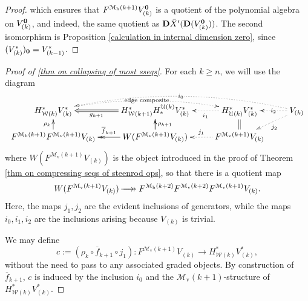 \documentclass[11pt]{amsart} \renewcommand{\baselinestretch}{1.4}
\theoremstyle{plain}
\theoremstyle{definition}
\renewcommand{\to}{\longrightarrow}
\newcommand{\calU}{\mathcal{U}}
\newcommand{\calw}{\mathcal{W}}
\newcommand{\calMv}{\mathcal{M}\dver}
\newcommand{\calMh}{\mathcal{M}\dhor}
\newcommand{\epi}{{\,\makebox[0cm][l]{\ensuremath\to}\to{}}}
\newcommand{\UEAX}{\bar{X}'}%
\newcommand{\dver}{_\mathrm{v}}
\newcommand{\dhor}{_\mathrm{h}}
\newcommand{\dual}{\mathbf{D}}
\begin{document}
\begin{Calculations of HWn for n nonzero}
\begin{proof}
which ensures that $F^{\calMh(k+1)}V_{(k)}^{\textbf{\textup{0}}}$ is a quotient of the polynomial algebra on $V_{(k)}^{\textbf{\textup{0}}}$, and indeed, the same quotient as $\dual\UEAX(\dual(V_{(k)}^{\textbf{\textup{0}}}))$. The second isomorphism is Proposition \ref{calculation in internal dimension zero}, since $(V^*_{(k)})_{\textbf{\textup{0}}}=V^*_{(k-1)}$.
\end{proof}
\begin{proof}[Proof of \ref{thm on collapsing of most sseqs}]
For each $k\geq n$, we will use the diagram
\[\xymatrix@R=4mm{
H^*_{\calw(k)}V^*_{(k)}\ar@{..>}@/^1.22em/[rr]|-{\textup{\,edge composite\,}}
&H^*_{\calw(k+1)}H_*^{\calU(k)}V^*_{(k)}\ar@{=>}[l]^-{g_{k+1}}%
&H^*_{\calU(k)}V^*_{(k)}\ar@{..>}[l]^-{i_1}
&V_{(k)}\ar@{..>}[l]|-{\,i_2\,}\ar@{..>}[ld]^-{j_2}\ar@{..>}@/_1.72em/[lll]|-{\,i_0\,}
\\
F^{\calMh(k+1)}F^{\calMv(k+1)}V_{(k)}\ar[u]^-{\rho_k}
&W(F^{\calMv(k+1)}V_{(k)})\ar[u]\ar@{->>}[l]_-{\overline{f}_{k+1}}\ar[u]_-{\rho_{k+1}}
&F^{\calMv(k+1)}V_{(k)}\ar@{..>}[l]_-{j_1}\ar@{=}[u]%
}\]
where $W(F^{\calMv(k+1)}V_{(k)})$ is the object introduced in the proof of Theorem \ref{thm on compressing seqs of steenrod ops}, so that there is a quotient map
\[W(F^{\calMv(k+1)}V_{(k)})\epi F^{\calMh(k+2)}F^{\calMv(k+2)}F^{\calMv(k+1)}V_{(k)}.\]
Here, the maps $j_1,j_2$ are the evident inclusions of generators, while the maps $i_0,i_1,i_2$ are the inclusions arising because $V_{(k)}$ is trivial.

 We may define 
\[c:=(\rho_k\circ \overline{f}_{k+1}\circ j_1):F^{\calMv(k+1)}V_{(k)}\to H^*_{\calw(k)}V^*_{(k)},\]
without the need to pass to any associated graded objects. By construction of $\overline{f}_{k+1}$,  $c$ is induced by the inclusion $i_0$ and the $\calMv(k+1)$-structure of $H^*_{\calw(k)}V^*_{(k)}$.


\end{proof}
\end{Calculations of HWn for n nonzero}
\end{document}
